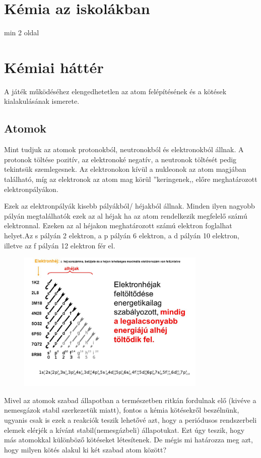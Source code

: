 \documentclass[colorlinks]{thesis-ekf}
\theoremstyle{definition}
\theoremstyle{remark}
\begin{document}
\chapter{Kémia az iskolákban}

min 2 oldal

\chapter{Kémiai háttér}

A játék működéséhez elengedhetetlen az atom felépítésének és a kötések kialakulásának ismerete. 
\section{Atomok}

Mint tudjuk az atomok protonokból, neutronokból és elektronokból állnak. A protonok töltése pozitív, az elektronoké negatív, a neutronok töltését pedig tekintsük szemlegesnek. Az elektronokon kívül a nukleonok az atom magjában található, míg az elektronok az atom mag körül ''keringenek,, előre meghatározott elektronpályákon.

Ezek az elektronpályák kisebb pályákból/ héjakból állnak. Minden ilyen nagyobb pályán megtalálhatók ezek az al héjak ha az atom rendelkezik megfelelő számú elektronnal. Ezeken az al héjakon meghatározott számú elektron foglalhat helyet.Az s pályán 2 elektron, a p pályán 6 elektron, a d pályán 10 elektron, illetve az f pályán 12 elektron fér el.\cite{sulinet_elektronpályák}
\begin{figure}[!ht]
	\centering
	\includegraphics[width=9cm]{elektronszerkezet}
	\caption{\cite{img_elektronkonfig}}\label{elektronszerkezet}
\end{figure}

Mivel az atomok szabad állapotban a természetben ritkán fordulnak elő (kivéve a nemesgázok stabil szerkezetük miatt), fontos a kémia kötésekről beszélnünk, ugyanis csak is ezek a reakciók teszik lehetővé azt, hogy a periódusos rendszerbeli elemek elérjék a kívánt stabil(nemesgázbeli) állapotukat. Ezt úgy teszik, hogy más atomokkal különböző kötéseket létesítenek.\cite{ionos_vidi} De mégis mi határozza meg azt, hogy milyen kötés alakul ki két szabad atom között?
\end{document}
